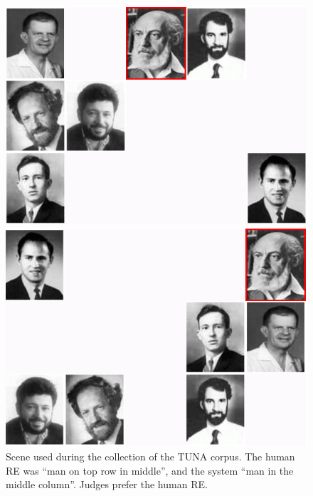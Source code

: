 

\begin{figure}[ht]
\begin{minipage}{0.50\linewidth}
\centering
\includegraphics[width=\textwidth]{images/s28t25.png}
\caption{Scene used during the collection of the TUNA corpus. The human  RE was ``man on top row in middle'', and the system ``man in the middle column''. Judges prefer the human RE.}
\label{s28t25}
\end{minipage}
\begin{minipage}{0.50\linewidth}
\centering
\includegraphics[width=\textwidth]{images/s120t26.png}

\end{minipage}
\end{figure}
